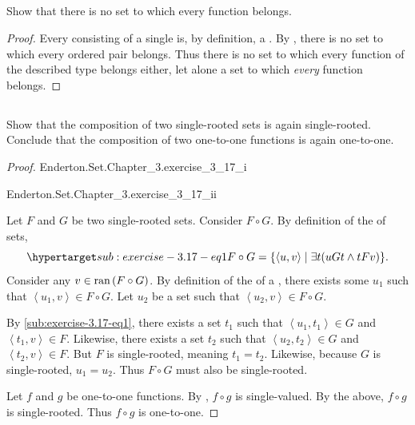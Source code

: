 \documentclass{report}
\newcommand{\pair}[1]{\left< #1 \right>}
\begin{document}
\subsection{}%

Show that there is no set to which every function belongs.

\begin{proof}

  Every  consisting of a single 
    is, by definition, a .
  By , there is no set to which every ordered pair
    belongs.
  Thus there is no set to which every function of the described type belongs
    either, let alone a set to which \textit{every} function belongs.

\end{proof}

\subsection{}%

Show that the composition of two single-rooted sets is again single-rooted.
Conclude that the composition of two one-to-one functions is again one-to-one.

\begin{proof}

  \statementpadding

    {Enderton.Set.Chapter\_3.exercise\_3\_17\_i}

    {Enderton.Set.Chapter\_3.exercise\_3\_17\_ii}

  Let $F$ and $G$ be two single-rooted sets.
  Consider $F \circ G$.
  By definition of the  of sets,
    \begin{equation}
      \hyperlabel{sub:exercise-3.17-eq1}
      F \circ G = \{\pair{u, v} \mid \exists t(uGt \land tFv)\}.
    \end{equation}
  Consider any $v \in \mathop{\text{ran}}{(F \circ G)}$.
  By definition of the  of a , there
    exists some $u_1$ such that $\pair{u_1, v} \in F \circ G$.
  Let $u_2$ be a set such that $\pair{u_2, v} \in F \circ G$.

  By \eqref{sub:exercise-3.17-eq1}, there exists a set $t_1$ such that
    $\pair{u_1, t_1} \in G$ and $\pair{t_1, v} \in F$.
  Likewise, there exists a set $t_2$ such that
    $\pair{u_2, t_2} \in G$ and $\pair{t_2, v} \in F$.
  But $F$ is single-rooted, meaning $t_1 = t_2$.
  Likewise, because $G$ is single-rooted, $u_1 = u_2$.
  Thus $F \circ G$ must also be single-rooted.

  \suitdivider

  Let $f$ and $g$ be one-to-one functions.
  By , $f \circ g$ is single-valued.
  By the above, $f \circ g$ is single-rooted.
  Thus $f \circ g$ is one-to-one.

\end{proof}
\end{document}
